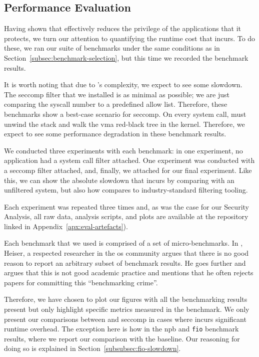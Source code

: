 \subsection{Performance Evaluation}\label{subsec:perf-eval}

Having shown that \af effectively reduces the privilege of the applications that
it protects, we turn our attention to quantifying the runtime cost that \af
incurs. To do these, we ran our suite of benchmarks under the same
conditions as in Section~\ref{subsec:benchmark-selection}, but this time we
recorded the benchmark results. 

It is worth noting that due to \af's complexity, we expect to see some slowdown.
The seccomp filter that we installed is as minimal as possible; we are just comparing
the syscall number to a predefined allow list. Therefore, these benchmarks show
a best-case scenario for seccomp. On every system call, \af must unwind the
stack and walk the \ac{vma} red-black tree in the kernel. Therefore, we expect
to see some performance degradation in these benchmark results.

We conducted three experiments with each benchmark: in one experiment, no
application had a system call filter attached. One experiment was conducted with
a seccomp filter attached, and, finally, we attached \af for our final
experiment. Like this, we can show the absolute slowdown that \af
incurs by comparing with an unfiltered system, but also how \af compares to
industry-standard filtering tooling.

Each experiment was repeated three times and, as was the case for our Security
Analysis, all raw data, analysis scripts, and plots are available at the
repository linked in Appendix~\ref{apx:eval-artefacts}).

Each benchmark that we used is comprised of a set of micro-benchmarks. In
\textcite{HeiserBenchmarkingCrimes}, Heiser, a respected researcher in the
\ac{os} community argues that there is no good reason to report an arbitrary
subset of benchmark results. He goes further and argues that this is not good
academic practice and mentions that he often rejects papers for committing this
``benchmarking crime''. 

Therefore, we have chosen to plot our figures with all the benchmarking results
present but only highlight specific metrics measured in the benchmark. We
only present our comparisons between \af and seccomp in cases where \af
incurs significant runtime overhead. The exception here is how in the \ac{npb}
and \texttt{fio} benchmark results, where we report our comparison with the
baseline. Our reasoning for doing so is explained in 
Section~\ref{subsubsec:fio-slowdown}. 

